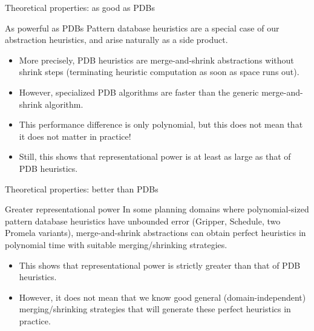 \documentclass{gkibeamer}
\begin{document}
\begin{frame}{Theoretical properties: as good as PDBs}
  \begin{block}{As powerful as PDBs}
    \alert{Pattern database heuristics} are a \alert{special case} of
    our abstraction heuristics, and arise naturally as a side product.
  \end{block}

  \begin{itemize}
  \item More precisely, PDB heuristics are merge-and-shrink
    abstractions without shrink steps (terminating heuristic
    computation as soon as space runs out).
  \item However, specialized PDB algorithms are faster than the
    generic merge-and-shrink algorithm.
  \item This performance difference is only \alert{polynomial}, but
    this does not mean that it does not matter in practice!
  \item Still, this shows that \alert{representational power} is
    \alert{at least as large} as that of PDB heuristics.
  \end{itemize}
\end{frame}

\begin{frame}{Theoretical properties: better than PDBs}
  \begin{block}{Greater representational power}
    In \alert{some planning domains} where polynomial-sized pattern
    database heuristics have unbounded error (Gripper, Schedule, two
    Promela variants), merge-and-shrink abstractions can obtain
    \alert{perfect heuristics} in polynomial time with suitable
    merging/shrinking strategies.
  \end{block}

  \begin{itemize}
  \item This shows that \alert{representational power} is
    \alert{strictly greater} than that of PDB heuristics.
  \item However, it does \alert{not} mean that we know good general
    (domain-independent) merging/shrinking strategies that will
    generate these perfect heuristics in practice.
  \end{itemize}
\end{frame}
\end{document}
